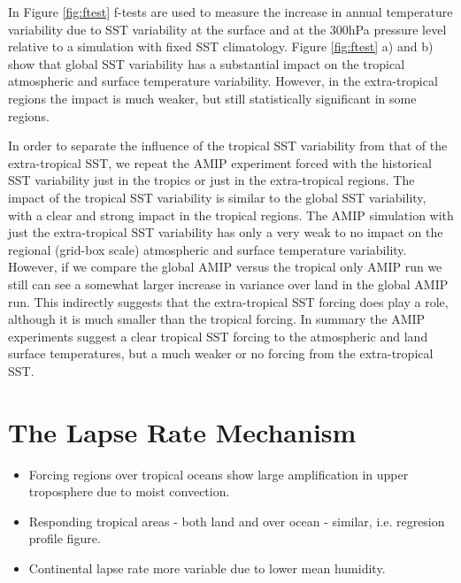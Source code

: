 In Figure \ref{fig:ftest} f-tests are used to measure the increase in annual 
temperature variability due to SST variability at the surface and at the 300hPa 
pressure level relative to a simulation with fixed SST climatology. Figure  
\ref{fig:ftest} a) and b) show that global SST variability has a substantial 
impact on the tropical atmospheric and surface temperature variability. However, 
in the extra-tropical regions the impact is much weaker, but still statistically 
significant in some regions.

In order to separate the influence of the tropical SST variability from that of 
the extra-tropical SST, we repeat the AMIP experiment forced with the historical 
SST variability just in the tropics or just in the extra-tropical regions. The 
impact of the tropical SST variability is similar to the global SST variability, 
with a clear and strong impact in the tropical regions.  The AMIP simulation 
with just the extra-tropical SST variability has only a very weak to no impact 
on the regional (grid-box scale) atmospheric and surface temperature 
variability.  However, if we compare the global AMIP versus the tropical only 
AMIP run we still can see a somewhat larger increase in variance over land in 
the global AMIP run. This indirectly suggests that the extra-tropical SST 
forcing does play a role, although it is much smaller than the tropical forcing.  
In summary the AMIP experiments suggest a clear tropical SST forcing to the 
atmospheric and land surface temperatures, but a much weaker or no forcing from 
the extra-tropical SST.


\section{The Lapse Rate Mechanism}
\begin{itemize}
	\item Forcing regions over tropical oceans show large amplification in upper 
		troposphere due to moist convection.
	\item Responding tropical areas - both land and over ocean - similar, i.e.  
		regresion profile figure.
	\item Continental lapse rate more variable due to lower mean humidity.
\end{itemize}


